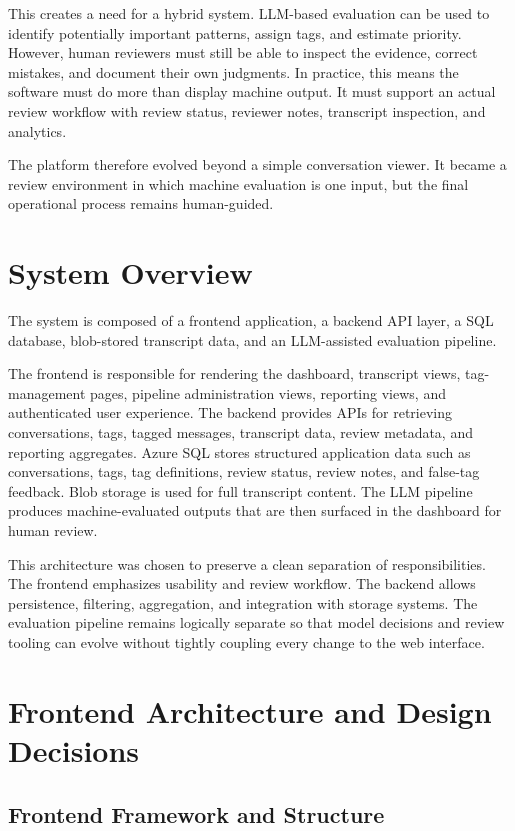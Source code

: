 \documentclass[12pt]{article}
\begin{document}
	This creates a need for a hybrid system. LLM-based evaluation can be used to identify potentially important patterns, assign tags, and estimate priority. However, human reviewers must still be able to inspect the evidence, correct mistakes, and document their own judgments. In practice, this means the software must do more than display machine output. It must support an actual review workflow with review status, reviewer notes, transcript inspection, and analytics.
	
	The platform therefore evolved beyond a simple conversation viewer. It became a review environment in which machine evaluation is one input, but the final operational process remains human-guided.
	
	\section{System Overview}
	
	The system is composed of a frontend application, a backend API layer, a SQL database, blob-stored transcript data, and an LLM-assisted evaluation pipeline.
	
	The frontend is responsible for rendering the dashboard, transcript views, tag-management pages, pipeline administration views, reporting views, and authenticated user experience. The backend provides APIs for retrieving conversations, tags, tagged messages, transcript data, review metadata, and reporting aggregates. Azure SQL stores structured application data such as conversations, tags, tag definitions, review status, review notes, and false-tag feedback. Blob storage is used for full transcript content. The LLM pipeline produces machine-evaluated outputs that are then surfaced in the dashboard for human review.
	
	This architecture was chosen to preserve a clean separation of responsibilities. The frontend emphasizes usability and review workflow. The backend allows persistence, filtering, aggregation, and integration with storage systems. The evaluation pipeline remains logically separate so that model decisions and review tooling can evolve without tightly coupling every change to the web interface.
	
	\section{Frontend Architecture and Design Decisions}
	
	\subsection{Frontend Framework and Structure}
	
\end{document}
